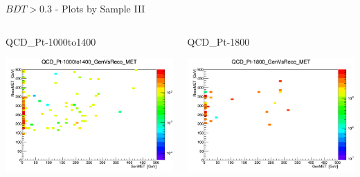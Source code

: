 \documentclass[8pt]{beamer}
\begin{document}
\begin{frame}{$BDT>0.3$ - Plots by Sample III}
\begin{columns}
\begin{block}{QCD\_Pt-1000to1400}
 
\centering
\includegraphics[width=\linewidth]{img/QCD_Pt-1000to1400_GenVsReco_MET.png} 
 
\end{block}

\begin{block}{QCD\_Pt-1800}
 
\centering
\includegraphics[width=\linewidth]{img/QCD_Pt-1800_GenVsReco_MET.png} 
 
\end{block}

\end{columns} 
 
\end{frame}
\end{document}
